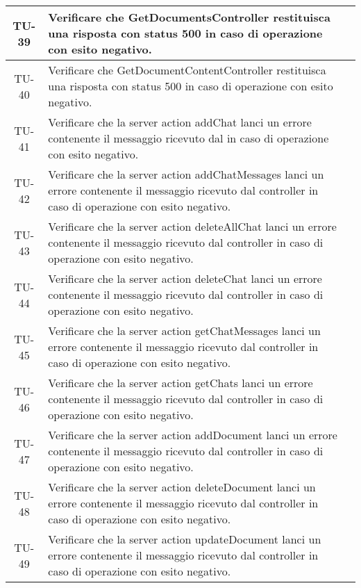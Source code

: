 \begin{xltabular}{\textwidth}{| c | X | c |}
    \hline
    TU-39 & Verificare che GetDocumentsController restituisca una risposta con status 500 in caso di operazione con esito negativo. & \textcolor{cmarkcolor}{} \\
    \hline
    TU-40 & Verificare che GetDocumentContentController restituisca una risposta con status 500 in caso di operazione con esito negativo. & \textcolor{cmarkcolor}{} \\
    \hline
    TU-41 & Verificare che la server action addChat lanci un errore contenente il messaggio ricevuto dal  in caso di operazione con esito negativo. & \textcolor{cmarkcolor}{} \\
    \hline
    TU-42 & Verificare che la server action addChatMessages lanci un errore contenente il messaggio ricevuto dal controller in caso di operazione con esito negativo. & \textcolor{cmarkcolor}{} \\
    \hline
    TU-43 & Verificare che la server action deleteAllChat lanci un errore contenente il messaggio ricevuto dal controller in caso di operazione con esito negativo. & \textcolor{cmarkcolor}{} \\
    \hline
    TU-44 & Verificare che la server action deleteChat lanci un errore contenente il messaggio ricevuto dal controller in caso di operazione con esito negativo. & \textcolor{cmarkcolor}{} \\
    \hline
    TU-45 & Verificare che la server action getChatMessages lanci un errore contenente il messaggio ricevuto dal controller in caso di operazione con esito negativo. & \textcolor{cmarkcolor}{} \\
    \hline
    TU-46 & Verificare che la server action getChats lanci un errore contenente il messaggio ricevuto dal controller in caso di operazione con esito negativo. & \textcolor{cmarkcolor}{} \\
    \hline
    TU-47 & Verificare che la server action addDocument lanci un errore contenente il messaggio ricevuto dal controller in caso di operazione con esito negativo. & \textcolor{cmarkcolor}{} \\
    \hline
    TU-48 & Verificare che la server action deleteDocument lanci un errore contenente il messaggio ricevuto dal controller in caso di operazione con esito negativo. & \textcolor{cmarkcolor}{} \\
    \hline
    TU-49 & Verificare che la server action updateDocument lanci un errore contenente il messaggio ricevuto dal controller in caso di operazione con esito negativo. & \textcolor{cmarkcolor}{} \\

\end{xltabular}
